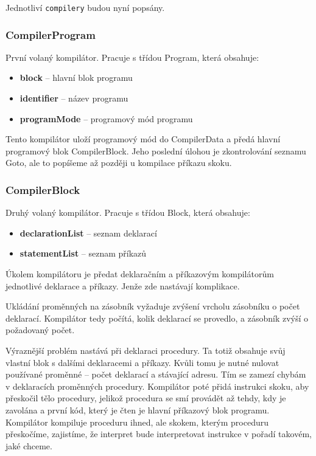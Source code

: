 \documentclass[
12pt,
a4paper,
pdftex,
czech,
titlepage
]{report}
\begin{document}
Jednotliví \texttt{compilery} budou nyní popsány.
 
\subsubsection{CompilerProgram}
První volaný kompilátor. Pracuje s třídou Program, která obsahuje:
\begin{itemize}
\item \textbf{block} -- hlavní blok programu
\item \textbf{identifier} -- název programu
\item \textbf{programMode} -- programový mód programu
\end{itemize}
    
   Tento kompilátor uloží programový mód do CompilerData a předá hlavní programový blok CompilerBlock. Jeho poslední úlohou je zkontrolování seznamu Goto, ale to popíšeme až později u kompilace příkazu skoku.
    
\subsubsection{CompilerBlock}
Druhý volaný kompilátor. Pracuje s třídou Block, která obsahuje:
\begin{itemize}
\item \textbf{declarationList} -- seznam deklarací
\item \textbf{statementList} -- seznam příkazů
\end{itemize}

Úkolem kompilátoru je předat deklaračním a příkazovým kompilátorům jednotlivé deklarace a příkazy. Jenže zde nastávají komplikace.

Ukládání proměnných na zásobník vyžaduje zvýšení vrcholu zásobníku o počet deklarací. Kompilátor tedy počítá, kolik deklarací se provedlo, a zásobník zvýší o požadovaný počet.

Výraznější problém nastává při deklaraci procedury. Ta totiž obsahuje svůj vlastní blok s dalšími deklaracemi a příkazy. Kvůli tomu je nutné nulovat používané proměnné -- počet deklarací a stávající adresu. Tím se zamezí chybám v deklaracích proměnných procedury. Kompilátor poté přidá instrukci skoku, aby přeskočil tělo procedury, jelikož procedura se smí provádět až tehdy, kdy je zavolána a první kód, který je čten je hlavní příkazový blok programu. Kompilátor kompiluje proceduru ihned, ale skokem, kterým proceduru přeskočíme, zajistíme, že interpret bude interpretovat instrukce v pořadí takovém, jaké chceme. 
\end{document}
